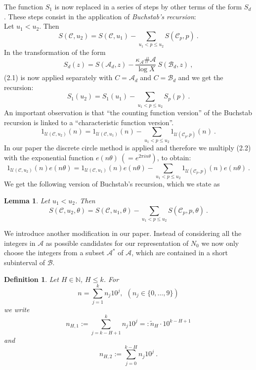 \documentclass{amsart}
\newtheorem{lemma}[theorem]{Lemma}
\numberwithin{equation}{subsection}
\newtheorem{definition}[theorem]{Definition}
\begin{document}
%
The function $S_1$ is now replaced in a series of steps by other terms of the form $S_d$. These steps consist in the application of \textit{Buchstab's recursion}:\\
Let $u_1< u_2$. Then 
\[
S(\mathcal{C}, u_2)=S(\mathcal{C}, u_1)-\sum_{u_1<p\leq u_2}S(\mathcal{C}_p, p)\:. \tag{2.1}
\]
In the transformation of the form
$$S_d(z)=S(\mathcal{A}_d, z)-\frac{\kappa_{\mathcal{A}}\#\mathcal{A}}{\log X}\:S(\mathcal{B}_d, z)\:,$$
(2.1) is now applied separately with $C=\mathcal{A}_d$ and $C=\mathcal{B}_d$ and we get the recursion:
$$S_1(u_2)=S_1(u_1)-\sum_{u_1<p\leq u_2}S_p(p)\:.$$
An important observation is that 
``the counting function version'' of the Buchstab recursion is linked to a ``characteristic function version''.
\[
1_{\mathcal{U}(\mathcal{C}, u_2)}(n)= 1_{\mathcal{U}(\mathcal{C}, u_1)}(n)-\sum_{u_1<p\leq u_2}1_{\mathcal{U}(\mathcal{C}_p, p)}(n)\:.  \tag{2.2}
\]
In our paper the discrete circle method is applied and therefore we multiply (2.2) with the exponential function $e(n\theta)\:(=e^{2\pi i n\theta})$, to obtain:
\[
1_{\mathcal{U}(\mathcal{C}, u_2)}(n)e(n\theta)=1_{\mathcal{U}(\mathcal{C}, u_1)}(n)e(n\theta)-\sum_{u_1<p\leq u_2}1_{\mathcal{U}(\mathcal{C}_p, p)}(n) e(n\theta)\:.  \tag{2.3}
\]
We get the following version of Buchstab's recursion, which we state as
%
%
\begin{lemma}\label{lem21}
Let $u_1<u_2$. Then 
\[
S(\mathcal{C}, u_2, \theta)=S(\mathcal{C}, u_1, \theta)-\sum_{u_1<p\leq u_2}S(\mathcal{C}_p, p, \theta)\:. \tag{2.4}
\]
\end{lemma}

We introduce another modification in our paper. Instead of considering all the integers in $\mathcal{A}$ as possible candidates for our representation of $N_0$ we now only choose the integers from a subset $\mathcal{A}^*$ of $\mathcal{A}$, which are contained in a short subinterval of $\mathcal{B}$.

\begin{definition}\label{rdef23}
Let $H\in \mathbb{N}$, $H\leq k$. For 
$$n=\sum_{j=1}^k n_j 10^j,\ \ (n_j\in \{0, \ldots, 9\})$$
we write
$$n_{H,1}:= \sum_{j=k-H+1}^k n_j 10^j=: \tilde{n}_H\cdot 10^{k-H+1}$$
and
$$n_{H, 2}:= \sum_{j=0}^{k-H} n_j 10^j\:.$$
\end{definition}
\end{document}
